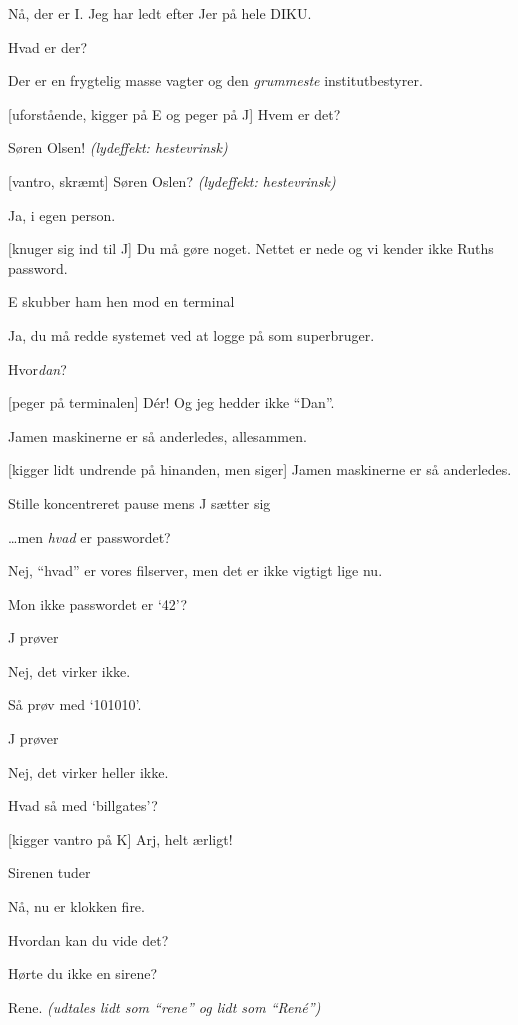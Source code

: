 \documentclass[danish]{article}
\begin{document}
\begin{sketch}
 Nå, der er I. Jeg har ledt efter Jer på hele DIKU.

 Hvad er der?

 Der er en frygtelig masse vagter og den \emph{grummeste}
institutbestyrer.

[uforstående, kigger på E og peger på J] Hvem er det?

 Søren Olsen! \emph{(lydeffekt: hestevrinsk)}

[vantro, skræmt] Søren Oslen? \emph{(lydeffekt: hestevrinsk)}

 Ja, i egen person.

[knuger sig ind til J] Du må gøre noget. Nettet er nede og vi kender
ikke Ruths password.

\scene E skubber ham hen mod en terminal

 Ja, du må redde systemet ved at logge på som superbruger.

 Hvor\emph{dan}?

[peger på terminalen] D\'er! Og jeg hedder ikke ``Dan''.

 Jamen maskinerne er så anderledes, allesammen.

[kigger lidt undrende på hinanden, men siger] Jamen maskinerne er så
anderledes.

\scene Stille koncentreret pause mens J sætter sig

 \ldots{}men \emph{hvad} er passwordet?

 Nej, ``hvad'' er vores filserver, men det er ikke vigtigt lige nu.

 Mon ikke passwordet er `42'?

\scene J prøver

 Nej, det virker ikke.

 Så prøv med `101010'.

\scene J prøver

 Nej, det virker heller ikke.

 Hvad så med `billgates'?

[kigger vantro på K] Arj, helt ærligt!

\scene Sirenen tuder

 Nå, nu er klokken fire.

 Hvordan kan du vide det?

 Hørte du ikke en sirene?

 Rene. \emph{(udtales lidt som ``rene'' og lidt som ``Ren\'e'')}


\end{sketch}
\end{document}
